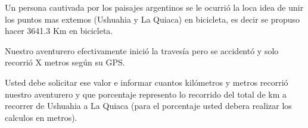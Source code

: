Un persona cautivada por los paisajes argentinos se le ocurrió la loca idea de unir los puntos mas extemos (Ushuahia y La Quiaca) en bicicleta, es decir se propuso hacer 3641.3 Km en bicicleta.

Nuestro aventurero efectivamente inició la travesía pero se accidentó y solo recorrió X metros según su GPS. 

Usted debe solicitar ese valor e informar cuantos kilómetros y metros recorrió nuestro aventurero y que porcentaje represento lo recorrido del total de km a recorrer de Ushuahia a La Quiaca (para el porcentaje usted debera realizar los calculos en metros).

